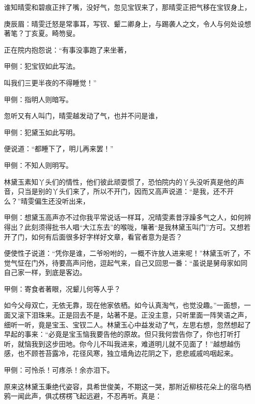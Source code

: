 \begin{parag}
    谁知晴雯和碧痕正拌了嘴，没好气，忽见宝钗来了，那晴雯正把气移在宝钗身上，\begin{note}庚辰眉：晴雯迁怒是常事耳，写钗、颦二卿身上，与踢袭人之文，令人与何处设想著笔？丁亥夏。畸笏叟。\end{note}正在院内抱怨说：“有事没事跑了来坐著，\begin{note}甲侧：犯宝钗如此写法。\end{note}叫我们三更半夜的不得睡觉！”\begin{note}甲侧：指明人则暗写。\end{note}忽听又有人叫门，晴雯越发动了气，也并不问是谁，\begin{note}甲侧：犯黛玉如此写明。\end{note}便说道：“都睡下了，明儿再来罢！”\begin{note}甲侧：不知人则明写。\end{note}林黛玉素知丫头们的情性，他们彼此顽耍惯了，恐怕院内的丫头没听真是他的声音，只当是别的丫头们来了，所以不开门，因而又高声说道：“是我，还不开么？”晴雯偏生还没听出来，\begin{note}甲侧：想黛玉高声亦不过你我平常说话一样耳，况晴雯素昔浮躁多气之人，如何辨得出？此刻须得批书人唱“大江东去”的喉咙，嚷著“是我林黛玉叫门”方可。又想若开了门，如何有后面很多好字样好文章，看官者意为是否？\end{note}便使性子说道：“凭你是谁，二爷吩咐的，一概不许放人进来呢！”林黛玉听了，不觉气怔在门外，待要高声问他，逗起气来，自己又回思一番：“虽说是舅母家如同自己家一样，到底是客边。\begin{note}甲侧：寄食者著眼，况颦儿何等人乎？\end{note}如今父母双亡，无依无靠，现在他家依栖。如今认真淘气，也觉没趣。”一面想，一面又滚下泪珠来。正是回去不是，站著不是。正没主意，只听里面一阵笑语之声，细听一听，竟是宝玉、宝钗二人。林黛玉心中益发动了气，左思右想，忽然想起了早起的事来：“必竟是宝玉恼我要告他的原故。但只我何尝告你了，你也打听打听，就恼我到这步田地。你今儿不叫我进来，难道明儿就不见面了！”越想越伤感，也不顾苍苔露冷，花径风寒，独立墙角边花阴之下，悲悲戚戚呜咽起来。\begin{note}甲侧：可怜杀！可疼杀！余亦泪下。\end{note}
\end{parag}


\begin{parag}
    原来这林黛玉秉绝代姿容，具希世俊美，不期这一哭，那附近柳枝花朵上的宿鸟栖鸦一闻此声，俱忒楞楞飞起远避，不忍再听。真是：
\end{parag}


